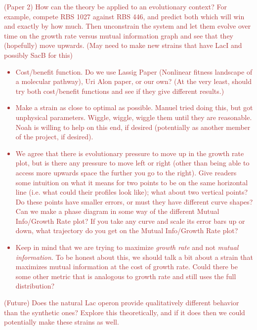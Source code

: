 \begin{itemize}
	\textcolor{brown}{
	\item (Paper 2) How can the theory be applied to an evolutionary context? For example, compete RBS 1027 against RBS 446, and predict both which will win and exactly by how much. Then unconstrain the system and let them evolve over time on the growth rate versus mutual information graph and see that they (hopefully) move upwards. (May need to make new strains that have LacI and possibly SacB for this)
	\begin{itemize}
		\item Cost/benefit function. Do we use Lassig Paper (Nonlinear fitness landscape of a molecular pathway), Uri Alon paper, or our own? (At the very least, should try both cost/benefit functions and see if they give different results.)
		\item Make a strain as close to optimal as possible. Manuel tried doing this, but got unphysical parameters. Wiggle, wiggle, wiggle them until they are reasonable. Noah is willing to help on this end, if desired (potentially as another member of the project, if desired).
		\item We agree that there is evolutionary pressure to move up in the growth rate plot, but is there any pressure to move left or right (other than being able to access more upwards space the further you go to the right). Give readers some intuition on what it means for two points to be on the same horizontal line (i.e. what could their profiles look like); what about two vertical points? Do these points have smaller errors, or must they have different curve shapes? Can we make a phase diagram in some way of the different Mutual Info/Growth Rate plot? If you take any curve and scale its error bars up or down, what trajectory do you get on the Mutual Info/Growth Rate plot?
		\item Keep in mind that we are trying to maximize \textit{growth rate} and not \textit{mutual information}. To be honest about this, we should talk a bit about a strain that maximizes mutual information at the cost of growth rate. Could there be some other metric that is analogous to growth rate and still uses the full distribution?
	\end{itemize}
	\item (Future) Does the natural Lac operon provide qualitatively different behavior than the synthetic ones? Explore this theoretically, and if it does then we could potentially make these strains as well.
	}
\end{itemize}